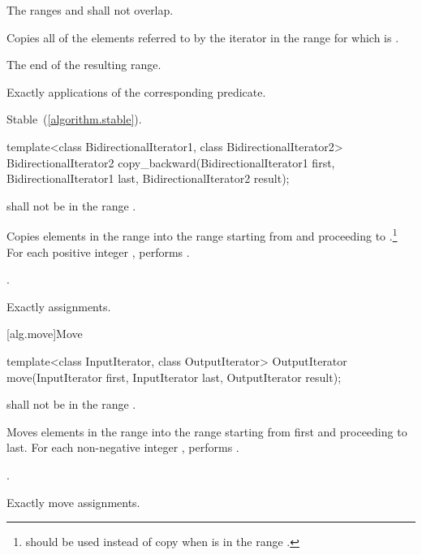 \begin{itemdescr}
\pnum
\requires The ranges  and  shall not overlap.

\pnum
\effects Copies all of the elements referred to by the iterator  in the range 
for which  is .

\pnum
\returns The end of the resulting range.

\pnum
\complexity Exactly  applications of the corresponding predicate.

\pnum
\remarks Stable~(\ref{algorithm.stable}).
\end{itemdescr}

%
\begin{itemdecl}
template<class BidirectionalIterator1, class BidirectionalIterator2>
  BidirectionalIterator2
    copy_backward(BidirectionalIterator1 first,
                  BidirectionalIterator1 last,
                  BidirectionalIterator2 result);
\end{itemdecl}

\begin{itemdescr}
\pnum
\requires
{}
shall not be in the range
.

\pnum
\effects
Copies elements in the range 
into the
range 
starting from
and proceeding to .\footnote{
should be used instead of copy when 
is in
the range
.}
For each positive integer
,
performs
.

\pnum
\returns
{}.

\pnum
\complexity
Exactly
assignments.
\end{itemdescr}

[alg.move]{Move}

%
\begin{itemdecl}
template<class InputIterator, class OutputIterator>
  OutputIterator move(InputIterator first, InputIterator last, OutputIterator result);
\end{itemdecl}

\begin{itemdescr}
\pnum
\requires
{}
shall not be in the range
.

\pnum
\effects
Moves elements in the range 
into the range 
starting from first and proceeding to last.
For each non-negative integer
,
performs
 .

\pnum
\returns
{}.

\pnum
\complexity
Exactly
move assignments.
\end{itemdescr}

